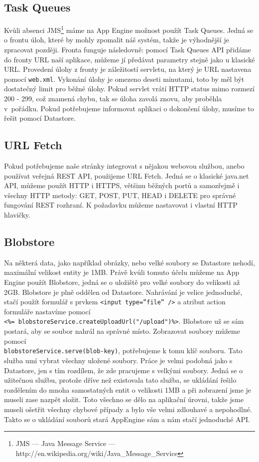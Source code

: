 \subsection{Task Queues}
Kvůli absenci JMS\footnote{JMS --- Java Message Service --- http://en.wikipedia.org/wiki/Java\_Message\_Service} máme na App Engine možnost použít Task Queues. Jedná se o frontu úloh, které by mohly zpomalit náš systém, takže je výhodnější je zpracovat později. Fronta funguje následovně: pomocí Task Queues API přidáme do fronty URL naší aplikace, můžeme jí předávat parametry stejně jako u klasické URL. Provedení úlohy z fronty je záležitostí servletu, na který je URL nastavena pomocí \verb|web.xml|. Vykonání úlohy je omezeno deseti minutami, toto by měl být dostatečný limit pro běžné úlohy. Pokud servlet vrátí HTTP status mimo rozmezí 200 - 299, což znamená chybu, tak se úloha zavolá znovu, aby proběhla v~pořádku. Pokud potřebujeme informovat aplikaci o dokončení úlohy, musíme to řešit pomocí Datastore.

\subsection{URL Fetch}
Pokud potřebujeme naše stránky integrovat s nějakou webovou službou, anebo používat veřejná REST API, použijeme URL Fetch. Jedná se o klasické java.net API, můžeme použít HTTP i HTTPS, většinu běžných portů a samozřejmě i všechny HTTP metody: GET, POST, PUT, HEAD i DELETE pro správné fungování REST rozhraní. K požadavku můžeme nastavovat i vlastní HTTP hlavičky.

\subsection{Blobstore}
Na některá data, jako například obrázky, nebo velké soubory se Datastore nehodí, maximální velikost entity je 1MB. Právě kvůli tomuto účelu můžeme na App Engine použít Blobstore, jedná se o uložiště pro velké soubory do velikosti až 2GB. Blobstore je plně oddělen od Datastore. Nahrávání je velice jednoduché, stačí použít formulář s prvkem \verb|<input type=”file” />| a atribut action formuláře nastavíme pomocí  \\\verb|<%= blobstoreService.createUploadUrl("/upload")%>|.
Blobstore už se sám postará, aby se soubor nahrál na správné místo. Zobrazovat soubory můžeme pomocí \\ \verb|blobstoreService.serve(blob-key)|, potřebujeme k tomu klíč souboru. Tato služba umí vybrat všechny uložené soubory. Práce je velmi podobná jako s Datastore, jen s tím rozdílem, že zde pracujeme s velkými soubory. Jedná se o užitečnou službu, protože dříve než existovala tato služba, se ukládání řešilo rozdělením do mnoha samostatných entit o velikosti 1MB a při zobrazení jsme je museli zase nazpět složit. Toto všechno se dělo na aplikační úrovni, takže jsme museli ošetřit všechny chybové případy a bylo vše velmi zdlouhavé a nepohodlné. Takto se o ukládání souborů stará AppEngine sám a nám stačí jednoduché API.

